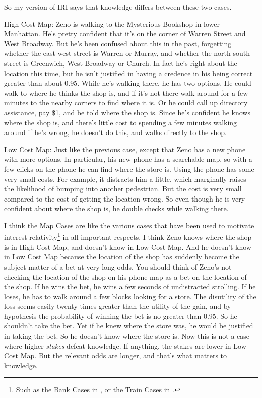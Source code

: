 \documentclass[oneside]{book}
\begin{document}
So my version of IRI says that knowledge differs between these two cases.

\begin{description*}
\item[High Cost Map:] Zeno is walking to the Mysterious Bookshop in lower Manhattan. He's pretty confident that it's on the corner of Warren Street and West Broadway. But he's been confused about this in the past, forgetting whether the east-west street is Warren or Murray, and whether the north-south street is Greenwich, West Broadway or Church. In fact he's right about the location this time, but he isn't justified in having a credence in his being correct greater than about 0.95. While he's walking there, he has two options. He could walk to where he thinks the shop is, and if it's not there walk around for a few minutes to the nearby corners to find where it is. Or he could call up directory assistance, pay \$1, and be told where the shop is. Since he's confident he knows where the shop is, and there's little cost to spending a few minutes walking around if he's wrong, he doesn't do this, and walks directly to the shop.
\item[Low Cost Map:] Just like the previous case, except that Zeno has a new phone with more options. In particular, his new phone has a searchable map, so with a few clicks on the phone he can find where the store is. Using the phone has some very small costs. For example, it distracts him a little, which marginally raises the likelihood of bumping into another pedestrian. But the cost is very small compared to the cost of getting the location wrong. So even though he is very confident about where the shop is, he double checks while walking there.
\end{description*}

\noindent I think the Map Cases are like the various cases that have been used to motivate interest-relativity\footnote{Such as the Bank Cases in \cite{Stanley2005-STAKAP}, or the Train Cases in \cite{Fantl2002}.} in all important respects. I think Zeno knows where the shop is in High Cost Map, and doesn't know in Low Cost Map. And he doesn't know in Low Cost Map because the location of the shop has suddenly become the subject matter of a bet at very long odds. You should think of Zeno's not checking the location of the shop on his phone-map as a bet on the location of the shop. If he wins the bet, he wins a few seconds of undistracted strolling. If he loses, he has to walk around a few blocks looking for a store. The disutility of the loss seems easily twenty times greater than the utility of the gain, and by hypothesis the probability of winning the bet is no greater than 0.95. So he shouldn't take the bet. Yet  if he knew where the store was, he would be justified in taking the bet. So he doesn't know where the store is. Now this is not a case where higher \textit{stakes} defeat knowledge. If anything, the stakes are lower in Low Cost Map. But the relevant odds are longer, and that's what matters to knowledge.
\end{document}
